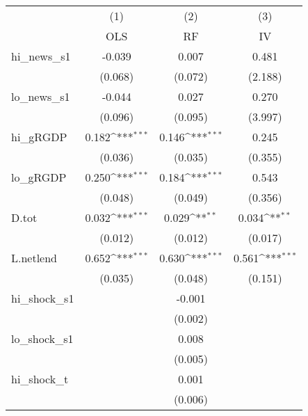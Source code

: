 {
\def\sym#1{\ifmmode^{#1}\else\(^{#1}\)\fi}
\begin{tabular}{l*{3}{c}}
\toprule
            &\multicolumn{1}{c}{(1)}&\multicolumn{1}{c}{(2)}&\multicolumn{1}{c}{(3)}\\
            &\multicolumn{1}{c}{OLS}&\multicolumn{1}{c}{RF}&\multicolumn{1}{c}{IV}\\
\midrule
hi\_news\_s1  &      -0.039         &       0.007         &       0.481         \\
            &     (0.068)         &     (0.072)         &     (2.188)         \\
\addlinespace
lo\_news\_s1  &      -0.044         &       0.027         &       0.270         \\
            &     (0.096)         &     (0.095)         &     (3.997)         \\
\addlinespace
hi\_gRGDP    &       0.182\sym{***}&       0.146\sym{***}&       0.245         \\
            &     (0.036)         &     (0.035)         &     (0.355)         \\
\addlinespace
lo\_gRGDP    &       0.250\sym{***}&       0.184\sym{***}&       0.543         \\
            &     (0.048)         &     (0.049)         &     (0.356)         \\
\addlinespace
D.tot       &       0.032\sym{***}&       0.029\sym{**} &       0.034\sym{**} \\
            &     (0.012)         &     (0.012)         &     (0.017)         \\
\addlinespace
L.netlend   &       0.652\sym{***}&       0.630\sym{***}&       0.561\sym{***}\\
            &     (0.035)         &     (0.048)         &     (0.151)         \\
\addlinespace
hi\_shock\_s1 &                     &      -0.001         &                     \\
            &                     &     (0.002)         &                     \\
\addlinespace
lo\_shock\_s1 &                     &       0.008         &                     \\
            &                     &     (0.005)         &                     \\
\addlinespace
hi\_shock\_t  &                     &       0.001         &                     \\
            &                     &     (0.006)         &                     \\

\end{tabular}}
